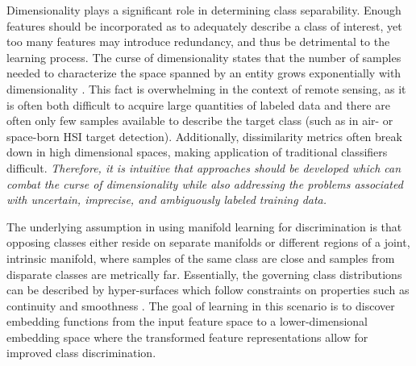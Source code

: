 Dimensionality plays a significant role in determining class separability.  Enough features should be incorporated as to adequately describe a class of interest, yet too many features may introduce redundancy, and thus be detrimental to the learning process. The curse of dimensionality states that the number of samples needed to characterize the space spanned by an entity grows exponentially with dimensionality \citep{Murphy2012, Theodoris2008KPCA}.  This fact is overwhelming in the context of remote sensing, as it is often both difficult to acquire large quantities of labeled data and there are often only few samples available to describe the target class (such as in air- or space-born HSI target detection). Additionally, dissimilarity metrics often break down in high dimensional spaces, making application of traditional classifiers difficult.  \textit{Therefore,  it is intuitive that approaches should be developed which can combat the curse of dimensionality while also addressing the problems associated with uncertain, imprecise, and ambiguously labeled training data.}

The underlying assumption in using manifold learning for discrimination is that opposing classes either reside on separate manifolds or different regions of a joint, intrinsic manifold, where samples of the same class are close and samples from disparate classes are metrically far.  Essentially, the governing class distributions can be described by hyper-surfaces which follow constraints on properties such as continuity and smoothness \citep{Belkin2004SemiSupLearningRiemannianManifolds}.  The goal of learning in this scenario is to discover embedding functions from the input feature space to a lower-dimensional embedding space where the transformed feature representations allow for improved class discrimination.


